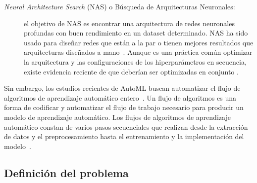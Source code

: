 \begin{description}
	\item [\textit{Neural Architecture Search} (NAS) o Búsqueda de Arquitecturas Neuronales:] el objetivo de NAS es encontrar una arquitectura de redes neuronales profundas con buen rendimiento en un dataset determinado. NAS ha sido usado para diseñar redes que están a la par o tienen mejores resultados que arquitecturas diseñados a mano~\cite{zoph2017learning, witsuba2019nas}. Aunque es una práctica común optimizar la arquitectura y las configuraciones de los hiperparámetros en secuencia, existe evidencia reciente de que deberían ser optimizadas en conjunto \cite{bischl2021hyperparameter}.
\end{description}

Sin embargo, los estudios recientes de AutoML buscan automatizar el flujo de algoritmos de aprendizaje automático entero~\cite{fuerer2015efficient, olson2019tpot, paszke2019pytorch, chen2018autostacker, swearingen2017atm}. Un flujo de algoritmos es una forma de codificar y automatizar el flujo de trabajo necesario para producir un modelo de aprendizaje automático. Los flujos de algoritmos de aprendizaje automático constan de varios pasos secuenciales que realizan desde la extracción de datos y el preprocesamiento hasta el entrenamiento y la implementación del modelo~\cite{web-mlpipe}.

\subsection{Definición del problema}\label{subsec:automl_problem_definition}


